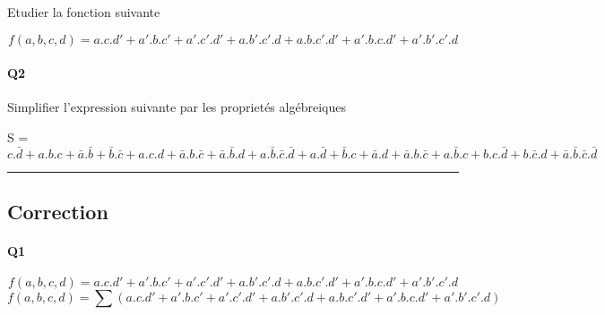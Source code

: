 Etudier la fonction suivante

$$f(a,b,c,d)=  a.c.d' + a'.b.c' + a'.c'.d' + a.b'.c'.d  +  a.b.c'.d' + a'.b.c.d' + a'.b'.c'.d $$


\paragraph{Q2}

Simplifier l'expression suivante par les proprietés algébreiques 

S = $ c.\bar d + a.b.c + \bar a.\bar b + \bar b.\bar c  +  a.c.d + \bar a.b.\bar c + \bar a.\bar b.d + a.\bar b.\bar c.\bar d  +  a.\bar d + \bar b.c + \bar a.d + \bar a.b.\bar c  +  a.\bar b.c + b.c.\bar d + b.\bar c.d + \bar a.\bar b.\bar c.\bar d $


\hrule width 1\linewidth
\pagebreak

\subsection{Correction}


\paragraph{Q1}

$$f(a,b,c,d)= a.c.d' + a'.b.c' + a'.c'.d' + a.b'.c'.d  +  a.b.c'.d' + a'.b.c.d' + a'.b'.c'.d $$
$$f(a,b,c,d)=\sum(a.c.d' + a'.b.c' + a'.c'.d' + a.b'.c'.d  +  a.b.c'.d' + a'.b.c.d' + a'.b'.c'.d)$$

